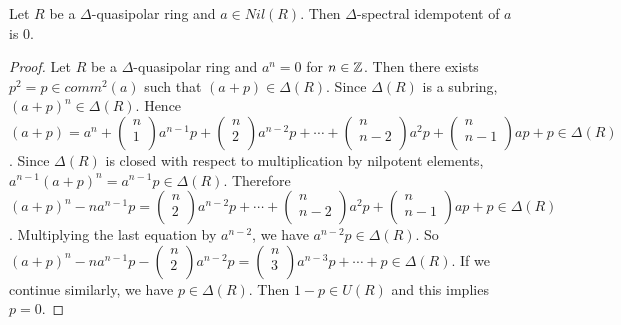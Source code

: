 \documentclass[10pt,a4paper]{amsart}
\begin{document}
\begin{lem}
    Let $R$ be a $\Delta$-quasipolar ring and $a\in Nil(R)$. Then  $\Delta$-spectral idempotent of $a$ is $0$.
\end{lem}

\begin{proof}
    Let $R$ be a $\Delta$-quasipolar ring and $a^n=0$ for $n\in \Bbb{Z}$. Then there exists $p^2=p\in comm^2(a)$ such that $(a+p)\in \Delta(R)$. Since $\Delta(R)$ is a subring, $(a+p)^n\in \Delta(R)$. Hence $(a+p)=a^n+\left(%
\begin{array}{c}
  n \\
  1 \\
\end{array}%
\right)a^{n-1}p+\left(%
\begin{array}{c}
  n \\
  2 \\
\end{array}%
\right)a^{n-2}p+\cdots +\left(%
\begin{array}{c}
  n \\
  n-2 \\
\end{array}%
\right)a^2p+\left(%
\begin{array}{c}
  n \\
  n-1 \\
\end{array}%
\right)ap+p\in \Delta(R)$. Since $\Delta(R)$ is closed with respect to multiplication by nilpotent elements, $a^{n-1}(a+p)^n=a^{n-1}p\in \Delta(R)$. Therefore $(a+p)^{n}-na^{n-1}p=\left(%
\begin{array}{c}
  n \\
  2 \\
\end{array}%
\right)a^{n-2}p+\cdots +\left(%
\begin{array}{c}
  n \\
  n-2 \\
\end{array}%
\right)a^2p+\left(%
\begin{array}{c}
  n \\
  n-1 \\
\end{array}%
\right)ap+p\in \Delta(R)$. Multiplying the last equation by $a^{n-2}$, we have $a^{n-2}p\in \Delta(R)$. So $(a+p)^{n}-na^{n-1}p-\left(%
\begin{array}{c}
  n \\
  2 \\
\end{array}%
\right)a^{n-2}p=\left(%
\begin{array}{c}
  n \\
  3 \\
\end{array}%
\right)a^{n-3}p+\cdots +p\in \Delta(R)$. If we continue similarly, we have $p\in \Delta(R)$. Then $1-p\in U(R)$ and this implies $p=0$.
\end{proof}
\end{document}
